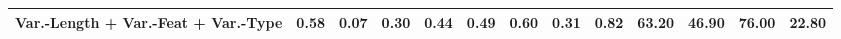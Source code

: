 \begin{tabular}{lrrrrrrrrrrrr}
Var.-Length + Var.-Feat + Var.-Type  &                  0.58 &                      0.07 &                 0.30 &                      0.44 &                        0.49 &                            0.60 &                       0.31 &                            0.82 &                                 63.20 &                                     46.90 &                                76.00 &                                     22.80 \\
\bottomrule
\end{tabular}

